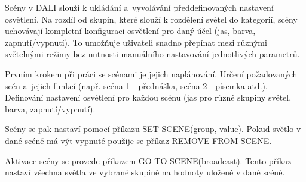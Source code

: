 Scény v DALI slouží k ukládání a~vyvolávání předdefinovaných nastavení osvětlení.
Na rozdíl od skupin, které slouží k rozdělení světel do kategorií, scény uchovávají
kompletní konfiguraci osvětlení pro daný účel (jas, barva, zapnutí/vypnutí).
To umožňuje uživateli snadno přepínat mezi různými světelnými režimy bez nutnosti
manuálního nastavování jednotlivých parametrů.


Prvním krokem při práci se scénami je jejich naplánování.
Určení požadovaných scén a~jejich funkcí (např. scéna 1 - přednáška, scéna 2 - písemka atd.).
Definování nastavení osvětlení pro každou scénu (jas pro různé skupiny světel, barva, zapnutí/vypnutí).

Scény se pak nastaví pomocí příkazu SET SCENE(group, value). Pokud světlo v dané scéně má výt vypnuté
použije se příkaz REMOVE FROM SCENE.

Aktivace scény se provede příkazem GO TO SCENE(broadcast). Tento příkaz nastaví všechna
světla ve vybrané skupině na hodnoty uložené v dané scéně.


